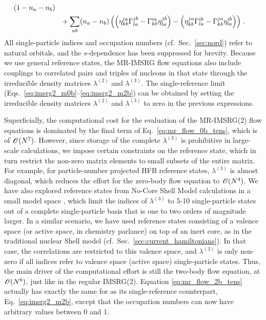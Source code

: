 {\begin{align}
     \left(1-n_{a}-n_{b}\right)
  \notag\\
  &\hphantom{=}
    +\sum_{ab}(n_{a}-n_{b})\left(\left(\eta^{ia}_{kb}\Gamma^{jb}_{la}-\Gamma^{ia}_{kb}\eta^{jb}_{la}\right)-\left(\eta^{ja}_{kb}\Gamma^{ib}_{la}-\Gamma^{ja}_{kb}\eta^{ib}_{la}\right)\right)\,.
  \label{eq:mr_flow_2b_tens}
\end{align}
All single-particle indices and occupation numbers (cf.~Sec.~\ref{sec:nord}) 
refer to natural orbitals, and the $s$-dependence has been suppressed for 
brevity. Because we use general reference states, the MR-IMSRG flow equations 
also include couplings to correlated pairs and triples of nucleons in that
state through the irreducible density matrices $\lambda^{(2)}$ and 
$\lambda^{(3)}$. The single-reference limit 
(Eqs.~\eqref{eq:imsrg2_m0b}--\eqref{eq:imsrg2_m2b}) 
can be obtained by setting the irreducible density matrices $\lambda^{(2)}$ 
and $\lambda^{(3)}$ to zero in the previous expressions.

Superficially, the computational cost for the evaluation of the MR-IMSRG(2) 
flow equations is dominated by the final term of Eq.~\eqref{eq:mr_flow_0b_tens},
which is of $\mathcal{O}(N^7)$. However, since storage of the complete $\lambda^{(3)}$ 
is prohibitive in large-scale calculations, we impose certain constraints on
the reference state, which in turn restrict the non-zero matrix elements to
small subsets of the entire matrix. For example, for particle-number projected
HFB reference states, $\lambda^{(3)}$ is almost diagonal, which reduces the
effort for the zero-body flow equation to $\mathcal{O}(N^4)$. We have also explored
reference states from No-Core Shell Model calculations in a small model space 
\cite{Gebrerufael:2016rp},
which limit the indices of $\lambda^{(3)}$ to 5-10 single-particle states
out of a complete single-particle basis that is one to two orders of magnitude
larger. In a similar scenario, we have used reference states consisting of 
a valence space (or active space, in chemistry parlance) on top of an inert
core, as in the traditional nuclear Shell model (cf.~Sec.~\ref{sec:current_hamiltonians}). 
In that case, the correlations are restricted to this valence space, and 
$\lambda^{(3)}$ is only non-zero if all indices refer to valence space
(active space) single-particle states. Thus, the main driver of the computational
effort is still the two-body flow equation, at $\mathcal{O}(N^6)$, just like in the
regular IMSRG(2). Equation \eqref{eq:mr_flow_2b_tens} actually has exactly
the same for as its single-reference counterpart, Eq.~\eqref{eq:imsrg2_m2b},
except that the occupation numbers can now have arbitrary values between 0 and 1.

}
